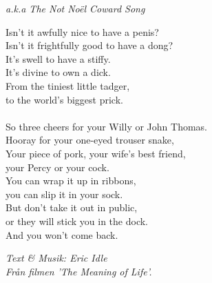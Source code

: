 {\footnotesize\textit{a.k.a The Not Noël Coward Song}}\par
\vspace{10pt}
Isn't it awfully nice to have a penis?\\
Isn't it frightfully good to have a dong?\\
It's swell to have a stiffy.\\
It's divine to own a dick.\\
From the tiniest little tadger,\\
to the world's biggest prick.\\
\\
So three cheers for your Willy or John Thomas.\\
Hooray for your one-eyed trouser snake,\\
Your piece of pork, your wife's best friend,\\
your Percy or your cock.\\
You can wrap it up in ribbons,\\
you can slip it in your sock.\\
But don't take it out in public,\\
or they will stick you in the dock.\\
And you won't come back.
\par
\vspace{10pt}
{\footnotesize\textit{Text \& Musik: Eric Idle \\
Från filmen 'The Meaning of Life'.}}
